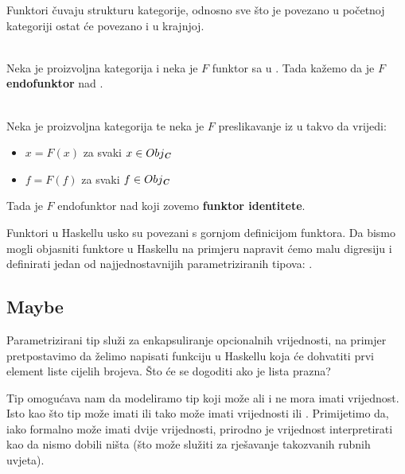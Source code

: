   Funktori čuvaju strukturu kategorije, odnosno sve što je povezano u početnoj
  kategoriji ostat će povezano i u krajnjoj.\\
  
  \begin{definition}\ \\
  
    \noindent Neka je  proizvoljna kategorija i neka je $F$ funktor sa
     u . Tada kažemo da je $F$ \textbf{endofunktor} nad
    .\\
  \end{definition}
  
  \begin{definition}\ \\
  
    \noindent Neka je  proizvoljna kategorija te neka je $F$ preslikavanje
    iz   u  takvo da vrijedi:
    \begin{itemize}
      \item $x = F(x)$ za svaki $x \in Obj_{\textbf{\emph{C}}}$
      \item $f = F(f)$ za svaki $f \in Obj_{\textbf{\emph{C}}}$
    \end{itemize}
    Tada je $F$ endofunktor nad  koji zovemo \textbf{funktor identitete}.\\
  \end{definition}
  
  Funktori u Haskellu usko su povezani s gornjom definicijom funktora. 
  Da bismo mogli objasniti funktore u Haskellu na primjeru napravit ćemo malu digresiju i definirati
  jedan od najjednostavnijih parametriziranih tipova: .
  
  \subsection{Maybe}
  Parametrizirani tip  služi za enkapsuliranje opcionalnih
  vrijednosti, na primjer pretpostavimo da želimo napisati funkciju u Haskellu koja će
  dohvatiti prvi element liste cijelih brojeva. Što će se dogoditi ako je lista prazna?

  Tip  omogućava nam da modeliramo tip koji može ali i ne mora
  imati vrijednost. Isto kao što tip  može imati 
  ili  tako  može imati vrijednosti  ili
  . Primijetimo da, iako formalno  može imati dvije
  vrijednosti, prirodno je vrijednost  interpretirati kao da nismo dobili ništa (što može
  služiti za rješavanje takozvanih rubnih uvjeta).

